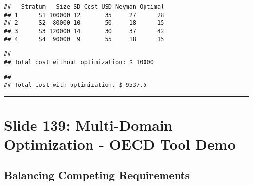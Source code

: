 \documentclass[
]{article}
\newenvironment{Shaded}{\begin{snugshade}}{\end{snugshade}}
\newcommand{\DecValTok}[1]{\textcolor[rgb]{0.00,0.00,0.81}{#1}}
\newcommand{\FunctionTok}[1]{\textcolor[rgb]{0.13,0.29,0.53}{\textbf{#1}}}
\newcommand{\NormalTok}[1]{#1}
\newcommand{\SpecialCharTok}[1]{\textcolor[rgb]{0.81,0.36,0.00}{\textbf{#1}}}
\newcommand{\StringTok}[1]{\textcolor[rgb]{0.31,0.60,0.02}{#1}}
\begin{document}
\begin{verbatim}
##   Stratum   Size SD Cost_USD Neyman Optimal
## 1      S1 100000 12       35     27      28
## 2      S2  80000 10       50     18      15
## 3      S3 120000 14       30     37      42
## 4      S4  90000  9       55     18      15
\end{verbatim}

\begin{Shaded}
\end{Shaded}

\begin{verbatim}
## 
## Total cost without optimization: $ 10000
\end{verbatim}

\begin{Shaded}
\end{Shaded}

\begin{verbatim}
## 
## Total cost with optimization: $ 9537.5
\end{verbatim}

\begin{center}\rule{0.5\linewidth}{0.5pt}\end{center}

\section{Slide 139: Multi-Domain Optimization - OECD Tool
Demo}\label{slide-139-multi-domain-optimization---oecd-tool-demo}

\subsection{Balancing Competing
Requirements}\label{balancing-competing-requirements}
\end{document}
